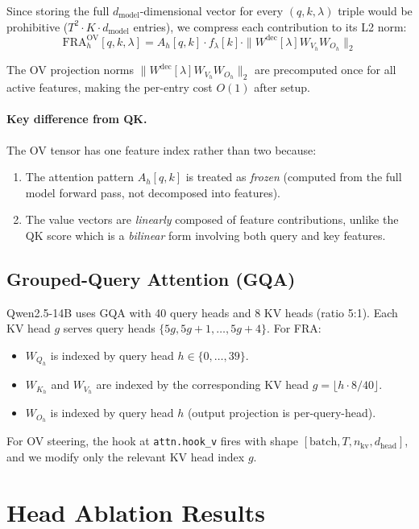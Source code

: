 \documentclass{article}
\theoremstyle{plain}
\theoremstyle{definition}
\theoremstyle{remark}
\newcommand{\Wdec}{W^{\mathrm{dec}}}
\newcommand{\dmodel}{d_{\mathrm{model}}}
\newcommand{\dhead}{d_{\mathrm{head}}}
\newcommand{\flambda}{f_\lambda}
\begin{document}
Since storing the full $\dmodel$-dimensional vector for every $(q,k,\lambda)$ triple would be prohibitive ($T^2 \cdot K \cdot \dmodel$ entries), we compress each contribution to its L2 norm:
\begin{equation}
    \mathrm{FRA}^{\mathrm{OV}}_h[q,k,\lambda] = A_h[q,k] \cdot \flambda[k] \cdot \|\Wdec[\lambda] W_{V_h} W_{O_h}\|_2
\end{equation}

The OV projection norms $\|\Wdec[\lambda] W_{V_h} W_{O_h}\|_2$ are precomputed once for all active features, making the per-entry cost $O(1)$ after setup.

\paragraph{Key difference from QK.} The OV tensor has one feature index rather than two because:
\begin{enumerate}
    \item The attention pattern $A_h[q,k]$ is treated as \emph{frozen} (computed from the full model forward pass, not decomposed into features).
    \item The value vectors are \emph{linearly} composed of feature contributions, unlike the QK score which is a \emph{bilinear} form involving both query and key features.
\end{enumerate}

\subsection{Grouped-Query Attention (GQA)}
\label{app:gqa}

Qwen2.5-14B uses GQA with 40 query heads and 8 KV heads (ratio 5:1). Each KV head $g$ serves query heads $\{5g, 5g+1, \ldots, 5g+4\}$. For FRA:
\begin{itemize}
    \item $W_{Q_h}$ is indexed by query head $h \in \{0, \ldots, 39\}$.
    \item $W_{K_h}$ and $W_{V_h}$ are indexed by the corresponding KV head $g = \lfloor h \cdot 8 / 40 \rfloor$.
    \item $W_{O_h}$ is indexed by query head $h$ (output projection is per-query-head).
\end{itemize}
For OV steering, the hook at \texttt{attn.hook\_v} fires with shape $[\text{batch}, T, n_{\mathrm{kv}}, \dhead]$, and we modify only the relevant KV head index $g$.

\section{Head Ablation Results}
\label{app:head_ablation}
\end{document}
